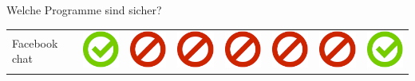 \documentclass[final]{beamer}
\newlength{\twocolwid}
\begin{document}
\begin{frame}[t]
\begin{columns}[t, totalwidth=\textwidth]
\begin{column}{\twocolwid}
\begin{block}{Welche Programme sind sicher?}
\begin{tabular}{ l | C{4cm} | C{4cm} | C{4cm} | C{4.5cm} | C{4cm} | C{5cm} | C{3cm} | }
Facebook chat & \includegraphics[scale=0.5]{pics/haken.png} & \includegraphics[scale=0.5]{pics/nohaken.png} & \includegraphics[scale=0.5]{pics/nohaken.png} & \includegraphics[scale=0.5]{pics/nohaken.png} & \includegraphics[scale=0.5]{pics/nohaken.png} & \includegraphics[scale=0.5]{pics/nohaken.png} & \includegraphics[scale=0.5]{pics/haken.png} \tabularnewline

\end{tabular}
\end{block}
\end{column}
\end{columns}
\end{frame}
\end{document}
